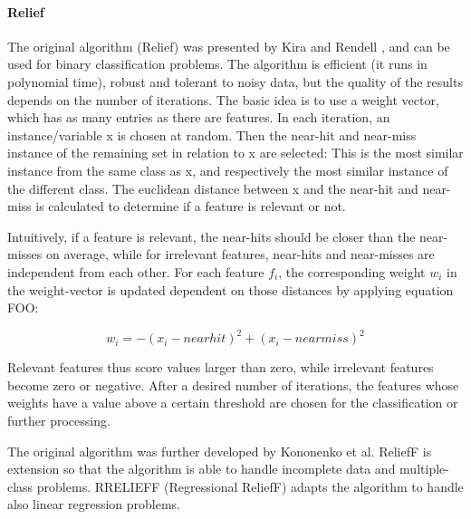 \paragraph{Relief}
\label{par:methods.flat.filter.relief}

The original algorithm (Relief) was presented by Kira and Rendell \cite{Kira:1992}, and can be used for binary classification problems. The algorithm is efficient (it runs in polynomial time), robust and tolerant to noisy data, but the quality of the results depends on the number of iterations.
The basic idea is to use a weight vector, which has as many entries as there are features. In each iteration, an instance/variable x is chosen at random. Then the near-hit and near-miss instance of the remaining set in relation to x are selected: This is the most similar instance from the same class as x, and respectively the most similar instance of the different class. The euclidean distance between x and the near-hit and near-miss is calculated to determine if a feature is relevant or not.  

Intuitively, if a feature is relevant, the near-hits should be closer than the near-misses on average, while for irrelevant features, near-hits and near-misses are independent from each other. 
For each feature $f_i$, the corresponding weight $w_i$ in the weight-vector is updated dependent on those distances by applying equation FOO:

\begin{equation}
w_i = - (x_i - nearhit)^2  + (x_i - nearmiss)^2
\end{equation}

Relevant features thus score values larger than zero, while irrelevant features become zero or negative. After a desired number of iterations, the features whose weights have a value above a certain threshold are chosen for the classification or further processing.

The original algorithm was further developed by Kononenko et al. ReliefF \cite{Kononenko:1997} is extension so that the algorithm is able to handle incomplete data and multiple-class problems. 
RRELIEFF (Regressional ReliefF) \cite{Robnik-Sikonja:97} adapts the algorithm to handle also linear regression problems.

